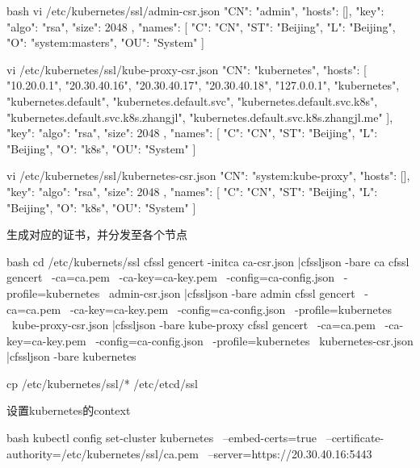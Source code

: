 \begin{outline}[enumerate]
\begin{code-in-enumerate}{bash}
vi /etc/kubernetes/ssl/admin-csr.json
{
    "CN": "admin",
    "hosts": [],
    "key": {
        "algo": "rsa",
        "size": 2048
    },
    "names": [
        {
            "C": "CN",
            "ST": "Beijing",
            "L": "Beijing",
            "O": "system:masters",
            "OU": "System"
        }
    ]
}

vi /etc/kubernetes/ssl/kube-proxy-csr.json
{
    "CN": "kubernetes",
    "hosts": [
        "10.20.0.1",
        "20.30.40.16",
        "20.30.40.17",
        "20.30.40.18",
        "127.0.0.1",
        "kubernetes",
        "kubernetes.default",
        "kubernetes.default.svc",
        "kubernetes.default.svc.k8s",
        "kubernetes.default.svc.k8s.zhangjl",
        "kubernetes.default.svc.k8s.zhangjl.me"
    ],
    "key": {
        "algo": "rsa",
        "size": 2048
    },
    "names": [
        {
            "C": "CN",
            "ST": "Beijing",
            "L": "Beijing",
            "O": "k8s",
            "OU": "System"
        }
    ]
}

vi /etc/kubernetes/ssl/kubernetes-csr.json
{
    "CN": "system:kube-proxy",
    "hosts": [],
    "key": {
        "algo": "rsa",
        "size": 2048
    },
    "names": [
        {
            "C": "CN",
            "ST": "Beijing",
            "L": "Beijing",
            "O": "k8s",
            "OU": "System"
        }
    ]
}
\end{code-in-enumerate}
生成对应的证书，并分发至各个节点
\begin{code-in-enumerate}{bash}
cd /etc/kubernets/ssl
cfssl gencert -initca ca-csr.json |cfssljson -bare ca
cfssl gencert \
      -ca=ca.pem \
      -ca-key=ca-key.pem \
      -config=ca-config.json \
      -profile=kubernetes \
      admin-csr.json |cfssljson -bare admin
cfssl gencert \
      -ca=ca.pem \
      -ca-key=ca-key.pem \
      -config=ca-config.json \
      -profile=kubernetes \
      kube-proxy-csr.json |cfssljson -bare kube-proxy
cfssl gencert \
      -ca=ca.pem \
      -ca-key=ca-key.pem \
      -config=ca-config.json \
      -profile=kubernetes \
      kubernetes-csr.json |cfssljson -bare kubernetes

cp /etc/kubernetes/ssl/* /etc/etcd/ssl
\end{code-in-enumerate}

  \1 设置kubernetes的context
\begin{code-in-enumerate}{bash}
kubectl config set-cluster kubernetes \
        --embed-certs=true \
        --certificate-authority=/etc/kubernetes/ssl/ca.pem \
        --server=https://20.30.40.16:5443


\end{code-in-enumerate}
\end{outline}
